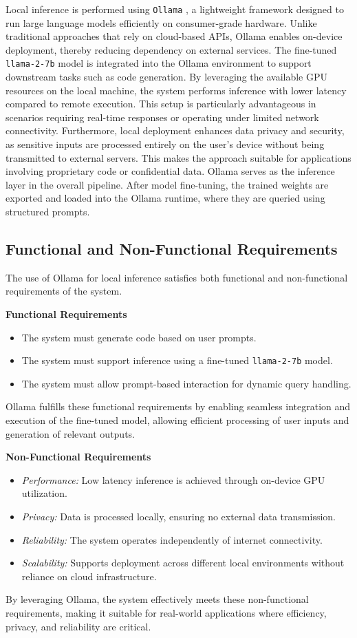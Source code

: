 Local inference is performed using \texttt{Ollama} \cite{Ollama2026}, a lightweight framework designed to run large language models efficiently on consumer-grade hardware. Unlike traditional approaches that rely on cloud-based APIs, Ollama enables on-device deployment, thereby reducing dependency on external services.
The fine-tuned \texttt{llama-2-7b} model is integrated into the Ollama environment to support downstream tasks such as code generation. By leveraging the available GPU resources on the local machine, the system performs inference with lower latency compared to remote execution. This setup is particularly advantageous in scenarios requiring real-time responses or operating under limited network connectivity.
Furthermore, local deployment enhances data privacy and security, as sensitive inputs are processed entirely on the user's device without being transmitted to external servers. This makes the approach suitable for applications involving proprietary code or confidential data.
Ollama serves as the inference layer in the overall pipeline. After model fine-tuning, the trained weights are exported and loaded into the Ollama runtime, where they are queried using structured prompts. 

\subsection{Functional and Non-Functional Requirements}

The use of Ollama for local inference satisfies both functional and non-functional requirements of the system.

\textbf{Functional Requirements}
\begin{itemize}
\item The system must generate code based on user prompts.
\item The system must support inference using a fine-tuned \texttt{llama-2-7b} model.
\item The system must allow prompt-based interaction for dynamic query handling.
\end{itemize}

Ollama fulfills these functional requirements by enabling seamless integration and execution of the fine-tuned model, allowing efficient processing of user inputs and generation of relevant outputs.

\textbf{Non-Functional Requirements}
\begin{itemize}
\item \textit{Performance:} Low latency inference is achieved through on-device GPU utilization.
\item \textit{Privacy:} Data is processed locally, ensuring no external data transmission.
\item \textit{Reliability:} The system operates independently of internet connectivity.
\item \textit{Scalability:} Supports deployment across different local environments without reliance on cloud infrastructure.
\end{itemize}

By leveraging Ollama, the system effectively meets these non-functional requirements, making it suitable for real-world applications where efficiency, privacy, and reliability are critical.
